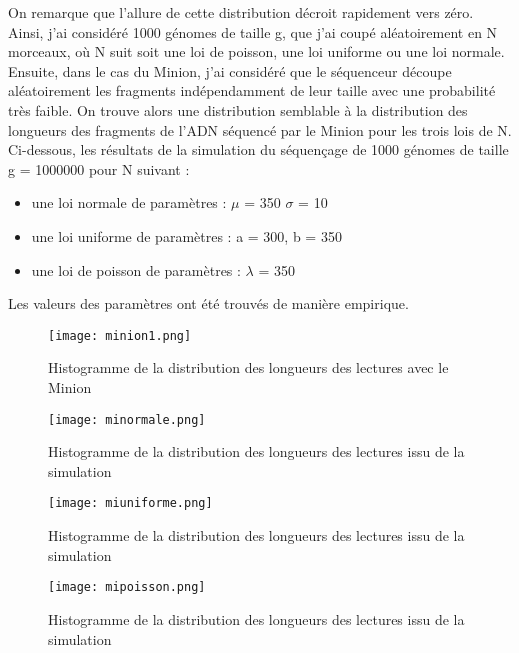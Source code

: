 \documentclass[11pt,a4paper]{article} %
\begin{document}
On remarque que l'allure de cette distribution décroit rapidement vers zéro.\\
Ainsi, j'ai considéré 1000 génomes de taille g, que j'ai coupé aléatoirement en N morceaux, où N suit soit une loi de poisson, une loi uniforme ou une loi normale.\\
Ensuite, dans le cas du Minion, j'ai considéré que le séquenceur découpe aléatoirement les fragments indépendamment de leur taille avec une probabilité très faible. On trouve alors une distribution semblable à la distribution des longueurs des fragments de l'ADN séquencé par le Minion pour les trois lois de N.\\ 
Ci-dessous, les résultats de la simulation du séquençage de 1000 génomes de taille g = 1000000 pour N suivant : 
\begin{itemize}
\item une loi normale de paramètres : $\mu$ = 350 $\sigma$ = 10
\item une loi uniforme de paramètres : a = 300, b = 350
\item une loi de poisson de paramètres : $\lambda$ = 350 \\
\end{itemize} 
Les valeurs des paramètres ont été trouvés de manière empirique.\\ 
\begin{figure}[h]
    \begin{minipage}[c]{.46\linewidth}
        \centering
        \texttt{[image: minion1.png]}
        \caption{Histogramme de la distribution des longueurs des lectures avec le Minion}
    \end{minipage}
    \hfill%
    \begin{minipage}[c]{.46\linewidth}
        \centering
        \texttt{[image: minormale.png]}
        \caption{Histogramme de la distribution des longueurs des lectures issu de la simulation}
    \end{minipage}
\end{figure} 
\begin{figure}[h]
    \begin{minipage}[c]{.46\linewidth}
        \centering
        \texttt{[image: miuniforme.png]}
        \caption{Histogramme de la distribution des longueurs des lectures issu de la simulation}
    \end{minipage}
    \hfill%
    \begin{minipage}[c]{.46\linewidth}
        \centering
        \texttt{[image: mipoisson.png]}
        \caption{Histogramme de la distribution des longueurs des lectures issu de la simulation}
    \end{minipage}
\end{figure}   
\end{document}
